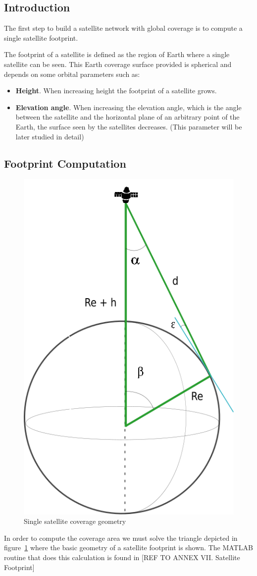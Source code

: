\subsection{Introduction}

The first step to build a satellite network with global coverage is to compute a single satellite footprint.

The footprint of a satellite is defined as the region of Earth where a single satellite can be seen. This Earth coverage surface provided is spherical and depends on some orbital parameters such as:

\begin{itemize}
\item \textbf{Height}. When increasing height the footprint of a satellite grows.
\item \textbf{Elevation angle}. When increasing the elevation angle, which is the angle between the satellite and the horizontal plane of an arbitrary point of the Earth, the surface seen by the satellites decreases. (This parameter will be later studied in detail)
\end{itemize}

\subsection{Footprint Computation}
 
\begin{figure}[H] %
	\centering
	\includegraphics[width=.3\textwidth]{./fig-Ch2-OrbitalCoverage/AngleSSatFoot.png}
	\caption{Single satellite coverage geometry}
	\label{fig:AngleSSatFoot}
\end{figure}

In order to compute the coverage area we must solve the triangle depicted in figure~\ref{fig:AngleSSatFoot} where the basic geometry of a satellite footprint is shown. The MATLAB routine that does this calculation is found in [{REF TO ANNEX VII. Satellite Footprint}]

